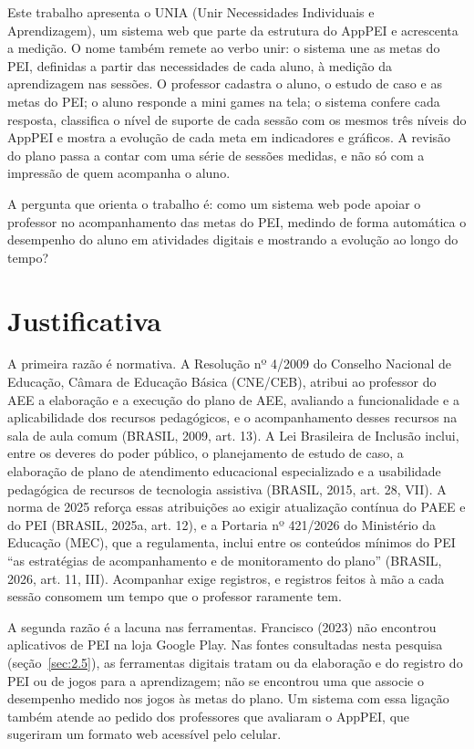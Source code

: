 Este trabalho apresenta o UNIA (Unir Necessidades Individuais e Aprendizagem), um sistema web que parte da estrutura do AppPEI e acrescenta a medição. O nome também remete ao verbo unir: o sistema une as metas do PEI, definidas a partir das necessidades de cada aluno, à medição da aprendizagem nas sessões. O professor cadastra o aluno, o estudo de caso e as metas do PEI; o aluno responde a mini games na tela; o sistema confere cada resposta, classifica o nível de suporte de cada sessão com os mesmos três níveis do AppPEI e mostra a evolução de cada meta em indicadores e gráficos. A revisão do plano passa a contar com uma série de sessões medidas, e não só com a impressão de quem acompanha o aluno.

A pergunta que orienta o trabalho é: como um sistema web pode apoiar o professor no acompanhamento das metas do PEI, medindo de forma automática o desempenho do aluno em atividades digitais e mostrando a evolução ao longo do tempo?

\section{Justificativa}\label{sec:1.1}

A primeira razão é normativa. A Resolução nº 4/2009 do Conselho Nacional de Educação, Câmara de Educação Básica (CNE/CEB), atribui ao professor do AEE a elaboração e a execução do plano de AEE, avaliando a funcionalidade e a aplicabilidade dos recursos pedagógicos, e o acompanhamento desses recursos na sala de aula comum (BRASIL, 2009, art. 13). A Lei Brasileira de Inclusão inclui, entre os deveres do poder público, o planejamento de estudo de caso, a elaboração de plano de atendimento educacional especializado e a usabilidade pedagógica de recursos de tecnologia assistiva (BRASIL, 2015, art. 28, VII). A norma de 2025 reforça essas atribuições ao exigir atualização contínua do PAEE e do PEI (BRASIL, 2025a, art. 12), e a Portaria nº 421/2026 do Ministério da Educação (MEC), que a regulamenta, inclui entre os conteúdos mínimos do PEI “as estratégias de acompanhamento e de monitoramento do plano” (BRASIL, 2026, art. 11, III). Acompanhar exige registros, e registros feitos à mão a cada sessão consomem um tempo que o professor raramente tem.

A segunda razão é a lacuna nas ferramentas. Francisco (2023) não encontrou aplicativos de PEI na loja Google Play. Nas fontes consultadas nesta pesquisa (seção~\ref{sec:2.5}), as ferramentas digitais tratam ou da elaboração e do registro do PEI ou de jogos para a aprendizagem; não se encontrou uma que associe o desempenho medido nos jogos às metas do plano. Um sistema com essa ligação também atende ao pedido dos professores que avaliaram o AppPEI, que sugeriram um formato web acessível pelo celular.

